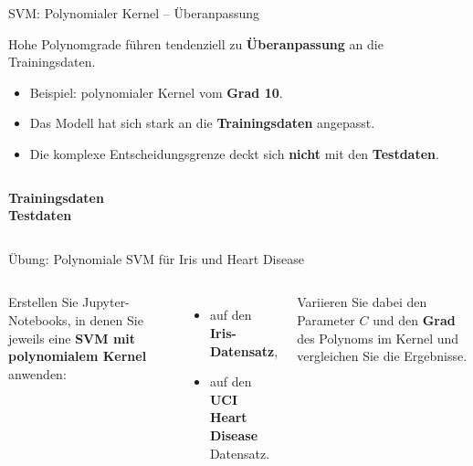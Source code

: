 \begin{frame}{SVM: Polynomialer Kernel -- Überanpassung}
  \par\medskip
\footnotesize
Hohe Polynomgrade führen tendenziell zu \textbf{Überanpassung} an die
Trainingsdaten.

\begin{itemize}
  \item Beispiel: polynomialer Kernel vom \textbf{Grad 10}.
  \item Das Modell hat sich stark an die \textbf{Trainingsdaten} angepasst.
  \item Die komplexe Entscheidungsgrenze deckt sich \textbf{nicht} mit den
        \textbf{Testdaten}.
\end{itemize}

\vspace{0.4em}
\begin{columns}
\centering
\textbf{Trainingsdaten}\\[2pt]


\centering
\textbf{Testdaten}\\[2pt]

\end{columns}
\end{frame}

\makequizpage{\QUIZURL}{\QUIZQRCODE}{\QUIZIMAGE}
\makequestionspage{\FRAGENIMAGE}

\begin{frame}{Übung: Polynomiale SVM für Iris und Heart Disease}
\begin{columns}
Erstellen Sie Jupyter-Notebooks, in denen Sie jeweils eine \textbf{SVM mit
polynomialem Kernel} anwenden:

\begin{itemize}
  \item auf den \textbf{Iris-Datensatz},
  \item auf den \textbf{UCI Heart Disease} Datensatz.
\end{itemize}

\vspace{0.4em}
Variieren Sie dabei den Parameter \textbf{$C$} und den \textbf{Grad} des
Polynoms im Kernel und vergleichen Sie die Ergebnisse.

\centering
{}
\end{columns}
\end{frame}

